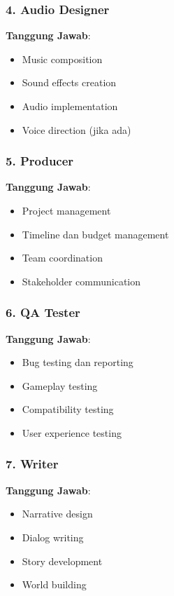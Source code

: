 \subsubsection{4. Audio Designer}

\textbf{Tanggung Jawab}:
\begin{itemize}
\item Music composition
\item Sound effects creation
\item Audio implementation
\item Voice direction (jika ada)
\end{itemize}

\subsubsection{5. Producer}

\textbf{Tanggung Jawab}:
\begin{itemize}
\item Project management
\item Timeline dan budget management
\item Team coordination
\item Stakeholder communication
\end{itemize}

\subsubsection{6. QA Tester}

\textbf{Tanggung Jawab}:
\begin{itemize}
\item Bug testing dan reporting
\item Gameplay testing
\item Compatibility testing
\item User experience testing
\end{itemize}

\subsubsection{7. Writer}

\textbf{Tanggung Jawab}:
\begin{itemize}
\item Narrative design
\item Dialog writing
\item Story development
\item World building
\end{itemize}

